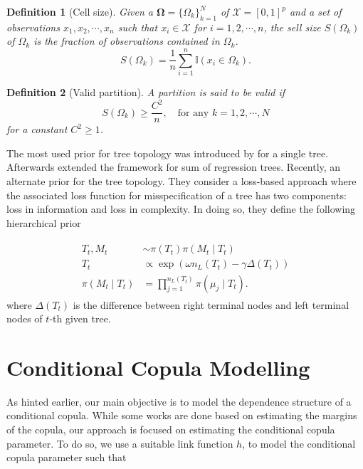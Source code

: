 \documentclass{amsart}
\newtheorem{definition}{Definition}[section]
\begin{document}
\begin{definition}[Cell size] Given a $\mathbf{\Omega} = \{\Omega_k\}_{k=1}^N$ of $\mathcal{X} = [0,1]^p$ and a set of observations $x_1, x_2, \cdots, x_n$ such that $x_i\in \mathcal{X}$ for $i=1,2,\cdots, n$, the sell size $S(\Omega_k)$ of $\Omega_k$
	is the fraction of observations contained in $\Omega_k$.
	\begin{equation*}
		S(\Omega_k) = \frac{1}{n}\sum_{i=1}^n \mathbb{I}(x_i\in \Omega_k).
	\end{equation*}
\end{definition}

\begin{definition}[Valid partition]
	A partition is said to be valid if
	\begin{equation*}
		S(\Omega_k) \ge \frac{C^2}{n}, \quad\text{for any } k=1,2,\cdots, N
	\end{equation*}
	for a constant $C^2\ge 1$.
\end{definition}

The most used prior for tree topology was introduced by \citet{chipman98BCART} for a single tree. Afterwards \citet{chipman2010BART} extended the framework for sum of regression trees. Recently, \citet{serafini2024lossbasedpriortreetopologies} an alternate prior for the tree topology. They consider a loss-based approach \cite{villa_loss-prior} where the associated loss function for misspecification of a tree has two components: loss in information and loss in complexity. In doing so, they define the following hierarchical prior

\begin{align}\label{eq:L-BART}
	\begin{split}
		T_t, M_t &\sim \pi(T_t)\pi(M_t\mid T_t)\\
		T_t &\propto \exp\left(\omega n_L(T_t)-\gamma\Delta(T_t)\right)\\
		\pi(M_t\mid T_t) & = \prod_{j=1}^{n_L(T_t)}\pi(\mu_j\mid T_t).
	\end{split}
\end{align}
where $\Delta(T_t)$ is the difference between right terminal nodes and left terminal nodes of $t$-th given tree.


\section{Conditional Copula Modelling}\label{sec:cond:cop}

As hinted earlier, our main objective is to model the dependence structure of a conditional copula. While some works are done based on estimating the margins of the copula, our approach is focused on estimating the conditional copula parameter. To do so, we use a suitable link function $h$, to model the conditional copula parameter such that 
\end{document}
